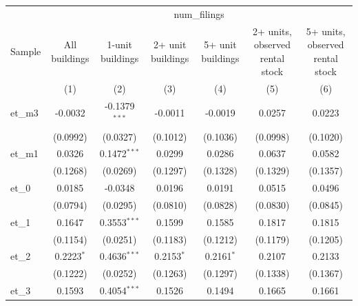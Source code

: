 
\begingroup
\centering
\begin{tabular}{lcccccc}
   \toprule
    & \multicolumn{6}{c}{num\_filings}\\
   Sample              & All buildings & 1-unit buildings & 2+ unit buildings & 5+ unit buildings & 2+ units, observed rental stock & 5+ units, observed rental stock \\   
                       & (1)           & (2)              & (3)               & (4)               & (5)                             & (6)\\  
   \midrule 
   et\_m3              & -0.0032       & -0.1379$^{***}$  & -0.0011           & -0.0019           & 0.0257                          & 0.0223\\   
                       & (0.0992)      & (0.0327)         & (0.1012)          & (0.1036)          & (0.0998)                        & (0.1020)\\   
   et\_m1              & 0.0326        & 0.1472$^{***}$   & 0.0299            & 0.0286            & 0.0637                          & 0.0582\\   
                       & (0.1268)      & (0.0269)         & (0.1297)          & (0.1328)          & (0.1329)                        & (0.1357)\\   
   et\_0               & 0.0185        & -0.0348          & 0.0196            & 0.0191            & 0.0515                          & 0.0496\\   
                       & (0.0794)      & (0.0295)         & (0.0810)          & (0.0828)          & (0.0830)                        & (0.0845)\\   
   et\_1               & 0.1647        & 0.3553$^{***}$   & 0.1599            & 0.1585            & 0.1817                          & 0.1815\\   
                       & (0.1154)      & (0.0251)         & (0.1183)          & (0.1212)          & (0.1179)                        & (0.1205)\\   
   et\_2               & 0.2223$^{*}$  & 0.4636$^{***}$   & 0.2153$^{*}$      & 0.2161$^{*}$      & 0.2107                          & 0.2133\\   
                       & (0.1222)      & (0.0252)         & (0.1263)          & (0.1297)          & (0.1338)                        & (0.1367)\\   
   et\_3               & 0.1593        & 0.4054$^{***}$   & 0.1526            & 0.1494            & 0.1665                          & 0.1661\\   

\end{tabular}
